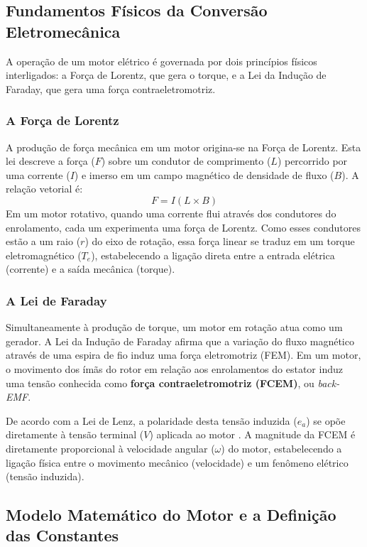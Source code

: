 \documentclass[12pt, a4paper, openright, oneside, brazilian]{abntex2}
\begin{document}
\subsection{Fundamentos Físicos da Conversão Eletromecânica}

A operação de um motor elétrico é governada por dois princípios físicos interligados: a Força de Lorentz, que gera o torque, e a Lei da Indução de Faraday, que gera uma força contraeletromotriz.

\subsubsection{A Força de Lorentz}

A produção de força mecânica em um motor origina-se na Força de Lorentz. Esta lei descreve a força ($F$) sobre um condutor de comprimento ($L$) percorrido por uma corrente ($I$) e imerso em um campo magnético de densidade de fluxo ($B$). A relação vetorial é:
\begin{equation}
    F = I(L \times B)
\end{equation}
Em um motor rotativo, quando uma corrente flui através dos condutores do enrolamento, cada um experimenta uma força de Lorentz. Como esses condutores estão a um raio ($r$) do eixo de rotação, essa força linear se traduz em um torque eletromagnético ($T_e$), estabelecendo a ligação direta entre a entrada elétrica (corrente) e a saída mecânica (torque).

\subsubsection{A Lei de Faraday}
Simultaneamente à produção de torque, um motor em rotação atua como um gerador. A Lei da Indução de Faraday afirma que a variação do fluxo magnético através de uma espira de fio induz uma força eletromotriz (FEM). Em um motor, o movimento dos ímãs do rotor em relação aos enrolamentos do estator induz uma tensão conhecida como \textbf{força contraeletromotriz (FCEM)}, ou \textit{back-EMF}.

De acordo com a Lei de Lenz, a polaridade desta tensão induzida ($e_a$) se opõe diretamente à tensão terminal ($V$) aplicada ao motor \parencite{infineon2011bldc}. A magnitude da FCEM é diretamente proporcional à velocidade angular ($\omega$) do motor, estabelecendo a ligação física entre o movimento mecânico (velocidade) e um fenômeno elétrico (tensão induzida).

\subsection{Modelo Matemático do Motor e a Definição das Constantes}
\end{document}
